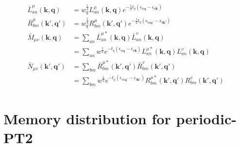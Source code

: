 \documentclass[a4paper,12pt]{article}
\begin{document}
\begin{equation}
	\begin{split}
		\bar{L}_{an}^{\mu}(\boldsymbol{k},\boldsymbol{q})
		&=w_{q}^{\frac 1 4}L_{an}^{\mu}(\boldsymbol{k},\boldsymbol{q})e^{-\frac{1}{2}t_q(\epsilon_{n\boldsymbol{q}}-\epsilon_{a\boldsymbol{k}})}\\
		\bar{R}_{bm}^{\mu}(\boldsymbol{k}',\boldsymbol{q}')
		&=w_{q}^{\frac 1 4}R_{bm}^{\mu}(\boldsymbol{k}',\boldsymbol{q}')e^{-\frac{1}{2}t_q(\epsilon_{m\boldsymbol{q}'}-\epsilon_{b\boldsymbol{k}'})}\\
		\bar{M}_{\mu v}(\boldsymbol{k},\boldsymbol{q})
		&=\sum_{an}\bar{L}_{an}^{\mu *}(\boldsymbol{k},\boldsymbol{q})\bar{L}_{an}^{v}(\boldsymbol{k},\boldsymbol{q})\\
		&=\sum_{an}w^{\frac 1 2}e^{-t_q(\epsilon_{n\boldsymbol{q}}-\epsilon_{a\boldsymbol{k}})}
		L_{an}^{\mu *}(\boldsymbol{k},\boldsymbol{q})L_{an}^{v}(\boldsymbol{k},\boldsymbol{q})\\
		\bar{N}_{\mu v}(\boldsymbol{k}',\boldsymbol{q}')
		&=\sum_{bm}\bar{R}_{bm}^{\mu *}(\boldsymbol{k}',\boldsymbol{q}')\bar{R}_{bm}^{v}(\boldsymbol{k}',\boldsymbol{q}')\\
		&=\sum_{bm}w^{\frac 1 2}e^{-t_q(\epsilon_{m\boldsymbol{q}'}-\epsilon_{b\boldsymbol{k}'})}
		R_{bm}^{\mu *}(\boldsymbol{k}',\boldsymbol{q}')R_{bm}^{v}(\boldsymbol{k}',\boldsymbol{q}')\\
	\end{split}
\end{equation}


\section{Memory distribution for periodic-PT2}
\end{document}
